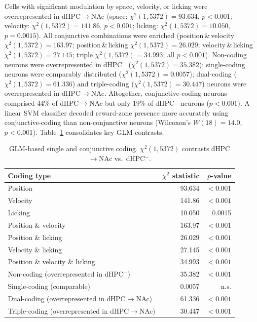 \documentclass[10pt,a4paper]{article}
\begin{document}
Cells with significant modulation by space, velocity, or licking were overrepresented in dHPC$\rightarrow$NAc (space: $\chi^2(1,5372)=93.634$, $p<0.001$; velocity: $\chi^2(1,5372)=141.86$, $p<0.001$; licking: $\chi^2(1,5372)=10.050$, $p=0.0015$). All conjunctive combinations were enriched (position\,\&\,velocity $\chi^2(1,5372)=163.97$; position\,\&\,licking $\chi^2(1,5372)=26.029$; velocity\,\&\,licking $\chi^2(1,5372)=27.145$; triple $\chi^2(1,5372)=34.993$; all $p<0.001$). Non-coding neurons were overrepresented in dHPC$^{-}$ ($\chi^2(1,5372)=35.382$); single-coding neurons were comparably distributed ($\chi^2(1,5372)=0.0057$); dual-coding ($\chi^2(1,5372)=61.336$) and triple-coding ($\chi^2(1,5372)=30.447$) neurons were overrepresented in dHPC$\rightarrow$NAc. Altogether, conjunctive-coding neurons comprised 44\% of dHPC$\rightarrow$NAc but only 19\% of dHPC$^{-}$ neurons ($p<0.001$). A linear SVM classifier decoded reward-zone presence more accurately using conjunctive-coding than non-conjunctive neurons (Wilcoxon's $W(18)=14.0$, $p<0.001$). Table~\ref{tab:glm} consolidates key GLM contrasts.

\begin{table}[h]
\centering
\caption{GLM-based single and conjunctive coding. $\chi^2(1,5372)$ contrasts dHPC$\rightarrow$NAc vs.\ dHPC$^{-}$.}
\label{tab:glm}
\begin{tabular}{lrr}
\toprule
Coding type & $\chi^2$ statistic & $p$-value \\
\midrule
Position & 93.634 & $<0.001$ \\
Velocity & 141.86 & $<0.001$ \\
Licking & 10.050 & 0.0015 \\
Position \& velocity & 163.97 & $<0.001$ \\
Position \& licking & 26.029 & $<0.001$ \\
Velocity \& licking & 27.145 & $<0.001$ \\
Position \& velocity \& licking & 34.993 & $<0.001$ \\
Non-coding (overrepresented in dHPC$^{-}$) & 35.382 & $<0.001$ \\
Single-coding (comparable) & 0.0057 & n.s. \\
Dual-coding (overrepresented in dHPC$\rightarrow$NAc) & 61.336 & $<0.001$ \\
Triple-coding (overrepresented in dHPC$\rightarrow$NAc) & 30.447 & $<0.001$ \\
\bottomrule
\end{tabular}
\end{table}
\end{document}
